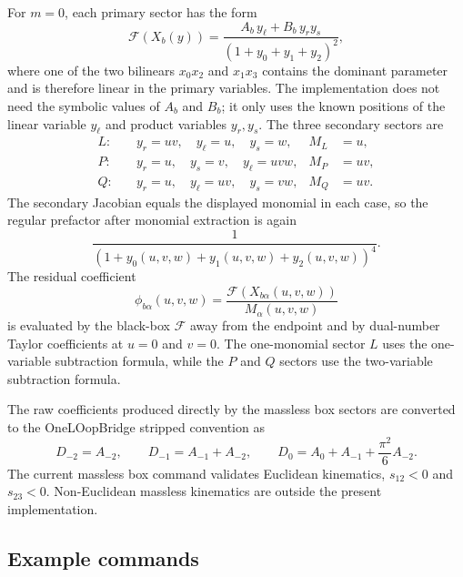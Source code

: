 \documentclass[11pt]{article}
\newcommand{\F}{\mathcal F}
\begin{document}
For \(m=0\), each primary sector has the form
\begin{equation}
  \F(X_b(y))
  =
  \frac{A_b\,y_\ell+B_b\,y_r y_s}
       {(1+y_0+y_1+y_2)^2},
\end{equation}
where one of the two bilinears \(x_0x_2\) and \(x_1x_3\) contains the dominant
parameter and is therefore linear in the primary variables.  The implementation
does not need the symbolic values of \(A_b\) and \(B_b\); it only uses the known
positions of the linear variable \(y_\ell\) and product variables \(y_r,y_s\).
The three secondary sectors are
\begin{align}
  L:\quad& y_r=uv,\quad y_\ell=u,\quad y_s=w,
  &
  M_L&=u,
  \\
  P:\quad& y_r=u,\quad y_s=v,\quad y_\ell=uvw,
  &
  M_P&=uv,
  \\
  Q:\quad& y_r=u,\quad y_\ell=uv,\quad y_s=vw,
  &
  M_Q&=uv.
\end{align}
The secondary Jacobian equals the displayed monomial in each case, so the
regular prefactor after monomial extraction is again
\begin{equation}
  \frac{1}{(1+y_0(u,v,w)+y_1(u,v,w)+y_2(u,v,w))^4}.
\end{equation}
The residual coefficient
\begin{equation}
  \phi_{b\alpha}(u,v,w)
  =
  \frac{\F(X_{b\alpha}(u,v,w))}{M_\alpha(u,v,w)}
\end{equation}
is evaluated by the black-box \(\F\) away from the endpoint and by dual-number
Taylor coefficients at \(u=0\) and \(v=0\).  The one-monomial sector \(L\) uses
the one-variable subtraction formula, while the \(P\) and \(Q\) sectors use the
two-variable subtraction formula.

The raw coefficients produced directly by the massless box sectors are
converted to the OneLOopBridge stripped convention as
\begin{equation}
  D_{-2}=A_{-2},
  \qquad
  D_{-1}=A_{-1}+A_{-2},
  \qquad
  D_0=A_0+A_{-1}+\frac{\pi^2}{6}A_{-2}.
\end{equation}
The current massless box command validates Euclidean kinematics,
\(s_{12}<0\) and \(s_{23}<0\).  Non-Euclidean massless kinematics are outside
the present implementation.

\subsection{Example commands}
\end{document}
